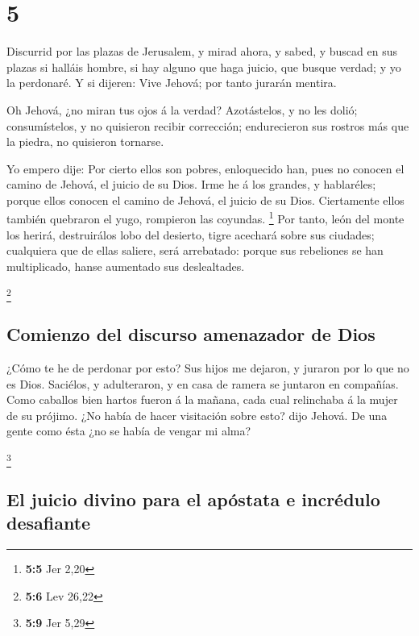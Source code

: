 \hypertarget{section-4}{%
\section{5}\label{section-4}}

 Discurrid por las plazas de Jerusalem, y mirad ahora, y
sabed, y buscad en sus plazas si halláis hombre, si hay alguno que haga
juicio, que busque verdad; y yo la perdonaré.  Y si
dijeren: Vive Jehová; por tanto jurarán mentira.

 Oh Jehová, ¿no miran tus ojos á la verdad? Azotástelos, y
no les dolió; consumístelos, y no quisieron recibir corrección;
endurecieron sus rostros más que la piedra, no quisieron tornarse.

 Yo empero dije: Por cierto ellos son pobres, enloquecido
han, pues no conocen el camino de Jehová, el juicio de su Dios.
 Irme he á los grandes, y hablaréles; porque ellos conocen
el camino de Jehová, el juicio de su Dios. Ciertamente ellos también
quebraron el yugo, rompieron las coyundas. \footnote{\textbf{5:5} Jer
  2,20}  Por tanto, león del monte los herirá,
destruirálos lobo del desierto, tigre acechará sobre sus ciudades;
cualquiera que de ellas saliere, será arrebatado: porque sus rebeliones
se han multiplicado, hanse aumentado sus deslealtades.

\footnote{\textbf{5:6} Lev 26,22}

\hypertarget{comienzo-del-discurso-amenazador-de-dios}{%
\subsection{Comienzo del discurso amenazador de
Dios}\label{comienzo-del-discurso-amenazador-de-dios}}

 ¿Cómo te he de perdonar por esto? Sus hijos me dejaron, y
juraron por lo que no es Dios. Saciélos, y adulteraron, y en casa de
ramera se juntaron en compañías.  Como caballos bien
hartos fueron á la mañana, cada cual relinchaba á la mujer de su
prójimo.  ¿No había de hacer visitación sobre esto? dijo
Jehová. De una gente como ésta ¿no se había de vengar mi alma?

\footnote{\textbf{5:9} Jer 5,29}

\hypertarget{el-juicio-divino-para-el-apuxf3stata-e-incruxe9dulo-desafiante}{%
\subsection{El juicio divino para el apóstata e incrédulo
desafiante}\label{el-juicio-divino-para-el-apuxf3stata-e-incruxe9dulo-desafiante}}

